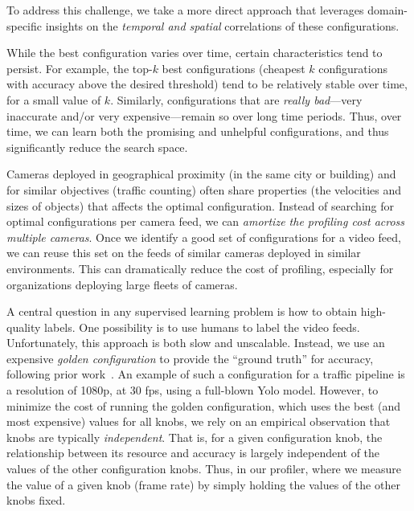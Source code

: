 To address this challenge, we take a more direct approach that leverages domain-specific insights on the {\em temporal and spatial} correlations of these configurations.

 While the best configuration varies over time, certain characteristics tend to persist. For example, the top-$k$ best configurations (cheapest $k$ configurations with accuracy above the desired threshold) tend to be relatively stable over time, for a small value of $k$. Similarly, configurations that are {\em really bad}---very inaccurate and/or very expensive---remain so over long time periods. %
Thus, over time, we can learn both the promising and unhelpful configurations, and thus significantly reduce the search space. 

 Cameras deployed in geographical proximity (\eg in the same city or building) and for similar objectives (\eg traffic counting) often share properties (\eg the velocities and sizes of objects) that affects the optimal configuration. Instead of searching for optimal configurations per camera feed, we can {\em amortize the profiling cost across multiple cameras}. Once we identify a good set of configurations for a video feed, we can reuse this set on the feeds of similar cameras deployed in similar environments. This can dramatically reduce the cost of profiling, especially for organizations deploying large fleets of cameras.

 A central question in any supervised learning problem is how to obtain high-quality labels. One possibility is to use humans to label the video feeds. Unfortunately, this approach is both slow and unscalable. Instead, we use an expensive {\em golden configuration} to provide the ``ground truth'' for accuracy, following prior work~\cite{noscope, videostar, focus}. An example of such a configuration for a traffic pipeline is a resolution of 1080p, at 30 fps, using a full-blown Yolo model. However, to minimize the cost of running the golden configuration, which uses the best (and most expensive) values for all knobs, we rely on an empirical observation that knobs are typically {\em independent}. That is, for a given configuration knob, the relationship between its resource and accuracy is largely independent of the values of the other configuration knobs. Thus, in our profiler, where we measure the value of a given knob (\eg frame rate) by simply holding the values of the other knobs fixed.

